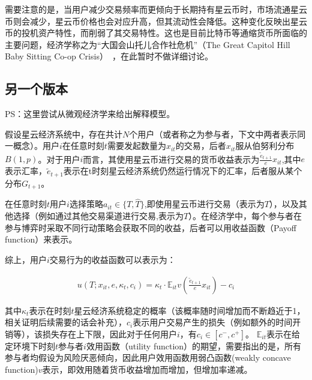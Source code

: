 
需要注意的是，当用户减少交易频率而更倾向于长期持有星云币时，市场流通星云币则会减少，星云币价格也会对应升高，但其流动性会降低。这种变化反映出星云币的投机资产特性，而削弱了其交易特性。这也是目前比特币等通缩货币所面临的主要问题，经济学称之为“大国会山托儿合作社危机”（The Great Capitol Hill Baby Sitting Co-op Crisis）~\cite{hens2007great}，在此暂时不做详细讨论。

\subsection{另一个版本}
PS：这里尝试从微观经济学来给出解释模型。

假设星云经济系统中，存在共计$N$个用户（或者称之为参与者，下文中两者表示同一概念）。用户$i$在任意时刻$t$需要发起数量为$x_{it}$的交易，后者$x_{it}$服从伯努利分布$B(1,p)$。对于用户$i$而言，其使用星云币进行交易的货币收益表示为$\frac{\widetilde{e}_{t+1}}{e}x_{it}$,其中$e$表示汇率，$\widetilde{e}_{t+1}$表示在t时刻星云经济系统仍然运行情况下的汇率，后者服从某个分布$G_{t+1}$。


在任意时刻$t$用户$i$选择策略$a_{it}\in \{T,\widehat{T}\}$,即使用星云币进行交易（表示为$T$），以及其他选择（例如通过其他交易渠道进行交易,表示为$\widehat{T}$）。在经济学中，每个参与者在参与博弈时采取不同行动策略会获取不同的收益，后者可以用收益函数（Payoff function）来表示。

综上，用户$i$交易行为的收益函数可以表示为：

\begin{align}
u(T;x_{it},e,\kappa_t,c_i)=\kappa_t \cdot \mathbb{E}_{it}v(\frac{\widetilde{e}_{t+1}}{e}x_{it})-c_i
\end{align}

其中$\kappa_t$表示在时刻$t$星云经济系统稳定的概率（该概率随时间增加而不断趋近于1，{\color{gray}相关证明后续需要的话会补充}），$c_i$表示用户交易产生的损失（例如额外的时间开销等），该损失存在上下限，因此对于任何用户$i$，有$c_i\in[c^-,c^+]$。
$\mathbb{E}_{it}$表示在给定环境下时刻$t$参与者$i$效用函数（utility function）的期望，需要指出的是，所有参与者均假设为风险厌恶倾向，因此用户效用函数用弱凸函数(weakly concave function)$v$表示，即效用随着货币收益增加而增加，但增加率递减。

